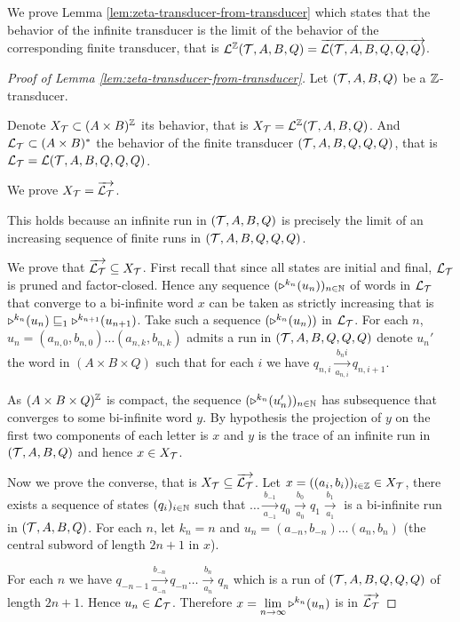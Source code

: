 We prove Lemma \ref{lem:zeta-transducer-from-transducer} which states that the behavior of the infinite transducer is the limit of the behavior of the corresponding finite transducer, that is ${\mathcal{L}}^{\mathbb{Z}}({\mathcal{T}},A,B,Q) = \overrightarrow{{\mathcal{L}}({\mathcal{T}},A,B,Q,Q,Q)}$.

\begin{proof}[Proof of Lemma \ref{lem:zeta-transducer-from-transducer}]
  Let $({\mathcal{T}},A,B,Q)$ be a ${\mathbb{Z}}$-transducer.

  Denote $X_{{\mathcal{T}}} \subset (A\times B)^{\mathbb{Z}}$ its behavior, that is $X_{{\mathcal{T}}}= {\mathcal{L}}^{\mathbb{Z}}({\mathcal{T}},A,B,Q)$.
  And ${\mathcal{L}}_{{\mathcal{T}}}\subset (A\times B)^*$ the behavior of the finite transducer $({\mathcal{T}},A,B,Q,Q,Q)$, that is ${\mathcal{L}}_{{\mathcal{T}}}={\mathcal{L}}({\mathcal{T}},A,B,Q,Q,Q)$.

  We prove $X_{{\mathcal{T}}}=\overrightarrow{{\mathcal{L}}_{{\mathcal{T}}}}$.

  This holds because an infinite run in $({\mathcal{T}},A,B,Q)$ is precisely the limit of an increasing sequence of finite runs in $({\mathcal{T}},A,B,Q,Q,Q)$.

  
  We prove that $\overrightarrow{{\mathcal{L}}_{{\mathcal{T}}}} \subseteq X_{{\mathcal{T}}}$.
  First recall that since all states are initial and final, ${\mathcal{L}}_{{\mathcal{T}}}$ is pruned and factor-closed. Hence any sequence $(\shift{k_n}{}(u_n))_{n\in\NN}$ of words in ${\mathcal{L}}_{{\mathcal{T}}}$ that converge to a bi-infinite word $x$ can be taken as strictly increasing that is $\shift{k_n}{}(u_n)\internal{1}\shift{k_{n+1}}{}(u_{n+1})$.
  Take such a sequence $(\shift{k_n}{}(u_n))$ in ${\mathcal{L}}_{{\mathcal{T}}}$.
  For each $n$, $u_n=(a_{n,0},b_{n,0})\dots (a_{n,k},b_{n,k})$ admits a run in $({\mathcal{T}},A,B,Q,Q,Q)$ denote $u_n'$ the word in $(A\times B \times Q)$ such that for each $i$ we have $q_{n,i} \xrightarrow[a_{n,i}]{b_n{i}} q_{n,i+1}$.

  As $(A\times B \times Q)^{\mathbb{Z}}$ is compact, the sequence $(\shift{k_n}{}(u_n'))_{n\in\NN}$ has subsequence that converges to some bi-infinite word $y$.
  By hypothesis the projection of $y$ on the first two components of each letter is $x$ and $y$ is the trace of an infinite run in $({\mathcal{T}},A,B,Q)$ and hence $x \in X_{{\mathcal{T}}}$.

  \medskip

  Now we prove the converse, that is $X_{{\mathcal{T}}} \subseteq \overrightarrow{{\mathcal{L}}_{{\mathcal{T}}}}$.
  Let $x = ((a_i,b_i))_{i\in {\mathbb{Z}}} \in X_{{\mathcal{T}}}$, there exists a sequence of states $(q_i)_{i\in{\mathbb{N}}}$ such that
  $… \xrightarrow[a_{-1}]{b_{-1}}q_0 \xrightarrow[a_0]{b_0} q_1 \xrightarrow[a_1]{b_1}$ is a bi-infinite run in $({\mathcal{T}},A,B,Q)$.
  For each $n$, let $k_n = n$ and $u_n=(a_{-n},b_{-n})\dots (a_n,b_n)$ (the central subword of length $2n+1$ in $x$).

  For each $n$ we have $q_{-n-1} \xrightarrow[a_{-n}]{b_{-n}} q_{-n} \dots \xrightarrow[a_n]{b_n} q_n$ which is a run of $({\mathcal{T}},A,B,Q,Q,Q)$ of length $2n+1$.
  Hence $u_n\in {\mathcal{L}}_{{\mathcal{T}}}$. Therefore $x=\lim\limits_{n\to\infty} \shift{k_n}{}(u_n)$ is in $\overrightarrow{{\mathcal{L}}_{{\mathcal{T}}}}$
  

\end{proof}







